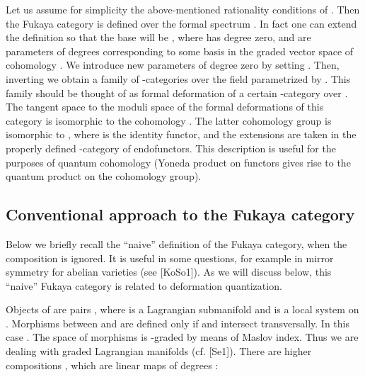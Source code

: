 \documentclass[a4paper,12pt]{article}
\begin{document}
Let us assume for simplicity
the above-mentioned rationality conditions of \myHighlight{$\omega$}\coordHE{}. Then the Fukaya
category is defined over
the formal spectrum \coordHE{}. In fact one can extend the definition
so that the base will be 
\coordHE{}, 
where \coordHE{} has degree zero, and
\coordHE{} are parameters of degrees \coordHE{} corresponding to some basis 
in the graded vector space of cohomology
\coordHE{}. We introduce new parameters \coordHE{} of degree zero
by setting \coordHE{}.
Then, inverting \coordHE{} we obtain a family of \myHighlight{$\A$}\coordHE{}-categories over 
the field \coordHE{}
parametrized by \coordHE{}. 
This family should be thought of as formal deformation of a certain \myHighlight{$\A$}\coordHE{}-category
over \coordHE{}. The tangent space to the moduli space of the formal
deformations of this category is isomorphic to the cohomology 
\coordHE{}. 
The latter cohomology group is isomorphic
to \coordHE{}, where \coordHE{} is the identity functor,
and the extensions are taken in the properly
defined \myHighlight{$\A$}\coordHE{}-category of endofunctors.
This description is useful for the purposes
of quantum cohomology (Yoneda product on functors gives rise
to the quantum product on the cohomology group).


\subsection{Conventional approach to the Fukaya category}

Below we briefly recall the ``naive'' definition of the Fukaya category,
when the composition \coordHE{} is ignored.
It is useful in some questions, for example in mirror
symmetry for abelian varieties (see [KoSo1]). As we will discuss below, this
``naive'' Fukaya category is related to deformation quantization.

Objects of \coordHE{} are pairs \coordHE{}, where
\coordHE{} is a Lagrangian submanifold and
\myHighlight{$\rho$}\coordHE{} is a local system on \coordHE{}. Morphisms
between \coordHE{} and \coordHE{} are defined
only if \coordHE{} and \coordHE{} intersect transversally.
In this case \coordHE{}.
The space of morphisms is \myHighlight{$\Z$}\coordHE{}-graded by means of Maslov index.
Thus we are dealing with graded Lagrangian
manifolds (cf. [Se1]).
There are higher compositions \coordHE{}, which are
linear maps of degrees \coordHE{}:
\end{document}
